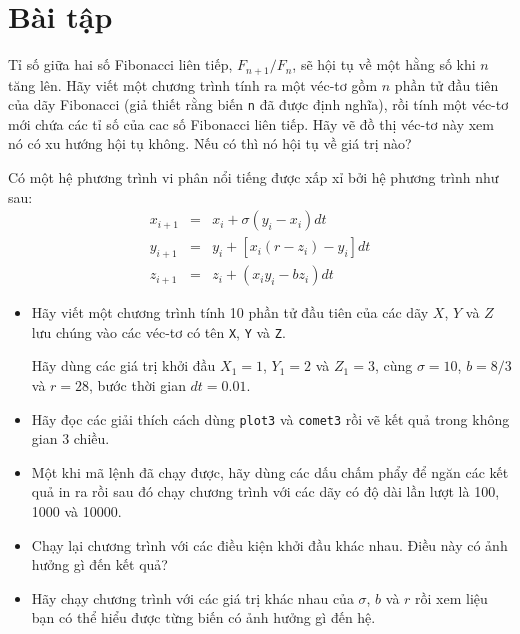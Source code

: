 \documentclass[12pt]{book}
\begin{document}
\section{Bài tập}

\begin{ex}
\label{fibratio}

Tỉ số giữa hai số Fibonacci liên tiếp, $F_{n+1}/F_{n}$, sẽ hội tụ về
một hằng số khi $n$ tăng lên. Hãy viết một chương trình tính ra một
véc-tơ gồm $n$ phần tử đầu tiên của dãy Fibonacci (giả thiết
rằng biến {\tt n} đã được định nghĩa), rồi tính một véc-tơ mới chứa
các tỉ số của cac số Fibonacci liên tiếp. Hãy vẽ đồ thị véc-tơ này 
xem nó có xu hướng hội tụ không. Nếu có thì nó hội tụ về giá trị nào?

\end{ex}

\begin{ex}
Có một hệ phương trình vi phân nổi tiếng được xấp xỉ bởi hệ phương trình
như sau:
%
\begin{eqnarray}
x_{i+1} &=& x_i + \sigma \left( y_i - x_i \right) dt  \\
y_{i+1} &=& y_i + \left[ x_i (r - z_i) - y_i \right] dt   \\
z_{i+1} &=& z_i + \left( x_i y_i - b z_i \right) dt
\end{eqnarray}
%
\begin{itemize}

\item Hãy viết một chương trình tính 10 phần tử đầu tiên của các dãy
$X$, $Y$ và $Z$ lưu chúng vào các véc-tơ có tên {\tt X}, {\tt Y}
và {\tt Z}.

Hãy dùng các giá trị khởi đầu $X_1 = 1$, $Y_1 = 2$ và $Z_1 = 3$, cùng
$\sigma = 10$, $b = 8/3$ và $r = 28$, bước thời gian $dt = 0.01$.

\item Hãy đọc các giải thích cách dùng {\tt plot3} và {\tt comet3} rồi
vẽ kết quả trong không gian 3 chiều.

\item Một khi mã lệnh đã chạy được, hãy dùng các dấu chấm phẩy để
ngăn các kết quả in ra rồi sau đó chạy chương trình với các dãy
có độ dài lần lượt là 100, 1000 và 10000.

\item Chạy lại chương trình với các điều kiện khởi đầu khác nhau.
Điều này có ảnh hưởng gì đến kết quả?

\item Hãy chạy chương trình với các giá trị khác nhau của $\sigma$, 
$b$ và $r$ rồi xem liệu bạn có thể hiểu được từng biến có ảnh hưởng
gì đến hệ.

\end{itemize}

\end{ex}
\end{document}
